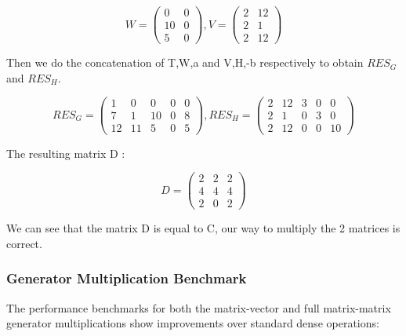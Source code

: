 \begin{equation}
  W =
  \begin{pmatrix}
    0    & 0 \\
    10     & 0 \\
    5     & 0
  \end{pmatrix},
  V =
  \begin{pmatrix}
    2     & 12    \\
    2    & 1      \\
    2     & 12
  \end{pmatrix}
\end{equation}

Then we do the concatenation of T,W,a and V,H,-b respectively to obtain $RES_G$
and $RES_H$.

\begin{equation}
  RES_G =
  \begin{pmatrix}
    1     & 0     & 0 & 0 & 0 \\
    7    & 1     & 10 & 0 & 8 \\
    12     & 11     & 5  & 0 & 5
  \end{pmatrix},
  RES_H =
  \begin{pmatrix}
    2     & 12     & 3 & 0 & 0 \\
    2    & 1     & 0 & 3 & 0 \\
    2     & 12     & 0  & 0 & 10
  \end{pmatrix}
\end{equation}

The resulting matrix D :

\begin{equation}
  D =
  \begin{pmatrix}
    2     & 2     & 2 \\
    4     & 4     & 4 \\
    2     & 0     & 2
  \end{pmatrix}
\end{equation}

We can see that the matrix D is equal to C, our way to multiply the 2
matrices is correct.

\subsubsection{Generator Multiplication Benchmark}

The performance benchmarks for both the matrix-vector and full
matrix-matrix generator multiplications show improvements over
standard dense operations:

